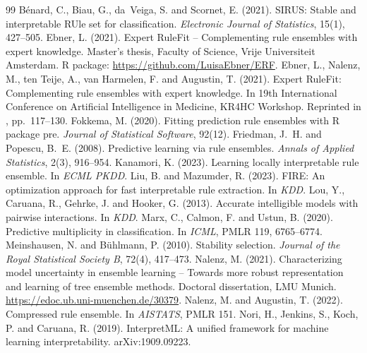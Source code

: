 \documentclass[11pt,a4paper]{article}
\theoremstyle{definition}\newtheorem{definition}{Definition}
\begin{document}
\begin{thebibliography}{99}\small
{} B{\'e}nard, C., Biau, G., da~Veiga, S. and Scornet, E. (2021). SIRUS: Stable and interpretable RUle set for classification. \emph{Electronic Journal of Statistics}, 15(1), 427--505.
 Ebner, L. (2021). Expert RuleFit -- Complementing rule ensembles with expert knowledge. Master's thesis, Faculty of Science, Vrije Universiteit Amsterdam. R package: \url{https://github.com/LuisaEbner/ERF}.
 Ebner, L., Nalenz, M., ten Teije, A., van Harmelen, F. and Augustin, T. (2021). Expert RuleFit: Complementing rule ensembles with expert knowledge. In 19th International Conference on Artificial Intelligence in Medicine, KR4HC Workshop. Reprinted in \citet{nalenz2021}, pp.~117--130.
 Fokkema, M. (2020). Fitting prediction rule ensembles with R package pre. \emph{Journal of Statistical Software}, 92(12).
 Friedman, J.~H. and Popescu, B.~E. (2008). Predictive learning via rule ensembles. \emph{Annals of Applied Statistics}, 2(3), 916--954.
 Kanamori, K. (2023). Learning locally interpretable rule ensemble. In \emph{ECML PKDD}.
 Liu, B. and Mazumder, R. (2023). FIRE: An optimization approach for fast interpretable rule extraction. In \emph{KDD}.
 Lou, Y., Caruana, R., Gehrke, J. and Hooker, G. (2013). Accurate intelligible models with pairwise interactions. In \emph{KDD}.
 Marx, C., Calmon, F. and Ustun, B. (2020). Predictive multiplicity in classification. In \emph{ICML}, PMLR 119, 6765--6774.
 Meinshausen, N. and B{\"u}hlmann, P. (2010). Stability selection. \emph{Journal of the Royal Statistical Society B}, 72(4), 417--473.
 Nalenz, M. (2021). Characterizing model uncertainty in ensemble learning -- Towards more robust representation and learning of tree ensemble methods. Doctoral dissertation, LMU Munich. \url{https://edoc.ub.uni-muenchen.de/30379}.
 Nalenz, M. and Augustin, T. (2022). Compressed rule ensemble. In \emph{AISTATS}, PMLR 151.
 Nori, H., Jenkins, S., Koch, P. and Caruana, R. (2019). InterpretML: A unified framework for machine learning interpretability. arXiv:1909.09223.

\end{thebibliography}
\end{document}
